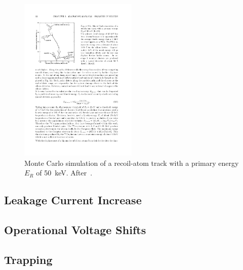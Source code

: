 \begin{figure}[!htbp]
\centering
\includegraphics[width=0.5\textwidth]{clusters.pdf}
\caption{\label{fig:clusters}Monte Carlo simulation of a recoil-atom track with a primary energy $E_R$
of 50~keV. After~\cite{van1980mechanisms}.}
\end{figure}



\subsection{Leakage Current Increase}

\subsection{Operational Voltage Shifts}

\subsection{Trapping}
\label{sec:trapping}
